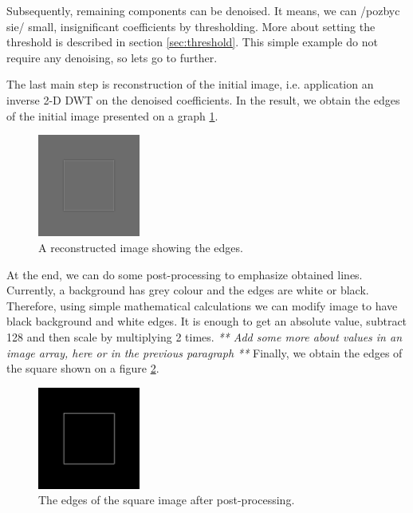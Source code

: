Subsequently, remaining components can be denoised. It means, we can /pozbyc sie/ small, insignificant coefficients by thresholding. More about setting the threshold is described in section \ref{sec:threshold}. This simple example do not require any denoising, so lets go to further.

The last main step is reconstruction of the initial image, i.e. application an inverse 2-D DWT on the denoised coefficients. In the result, we obtain the edges of the initial image presented on a graph \ref{fig:square_idwt}.

\begin{figure}[h]
	\centering
	\includegraphics[width=0.3\textwidth]{graphs/square_db2.png}
	\caption{A reconstructed image showing the edges.}
	\label{fig:square_idwt}
\end{figure}

At the end, we can do some post-processing to emphasize obtained lines. Currently, a background has grey colour and the edges are white or black. Therefore, using simple mathematical calculations we can modify image to have black background and white edges. It is enough to get an absolute value, subtract 128 and then scale by multiplying 2 times.
\textit{** Add some more about values in an image array, here or in the previous paragraph **}
Finally, we obtain the edges of the square shown on a figure \ref{fig:square_idwt_pp}.

\begin{figure}[h]
	\centering
	\includegraphics[width=0.3\textwidth]{graphs/square_db2_pp.png}
	\caption{The edges of the square image after post-processing.}
	\label{fig:square_idwt_pp}
\end{figure}

